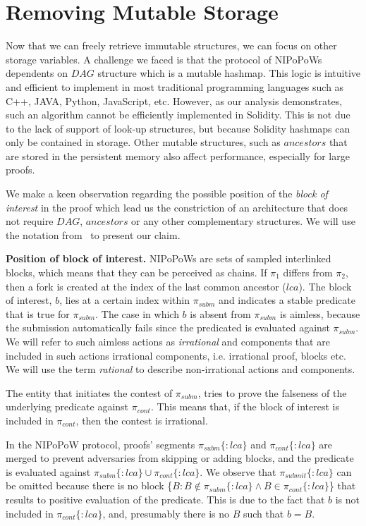 \section{Removing Mutable Storage}

Now that we can freely retrieve immutable structures, we can focus on other
storage variables. A challenge we faced is that the protocol of NIPoPoWs
dependents on $DAG$ structure which is a mutable hashmap. This logic is
intuitive and efficient to implement in most traditional programming languages
such as C++, JAVA, Python, JavaScript, etc. However, as our analysis
demonstrates, such an algorithm cannot be efficiently implemented in Solidity.
This is not due to the lack of support of look-up structures, but because
Solidity hashmaps can only be contained in storage. Other
mutable structures, such as $ancestors$ that are stored in the persistent
memory also affect performance, especially for large proofs.

We make a keen observation regarding the possible position of the \emph{block
of interest} in the proof which lead us the constriction of an architecture
that does not require $DAG$, $ancestors$ or any other complementary structures.
We will use the notation from~\cite{nipopows} to present our claim.

\noindent \textbf{Position of block of interest.} NIPoPoWs are sets of sampled
interlinked blocks, which means that they can be perceived as chains. If
$\pi_1$ differs from $\pi_2$, then a fork is created at the index of the last
common ancestor ($lca$). The block of interest, $b$, lies at a certain index
within $\pi_{subm}$ and indicates a stable predicate~\cite{nipopows,
generic-client} that is true for $\pi_{subm}$. The case in which $b$ is absent
from $\pi_{subm}$ is aimless, because the submission automatically fails since
the predicated is evaluated against $\pi_{subm}$. We will refer to such aimless
actions as \emph{irrational} and components that are included in such actions
irrational components, i.e.  irrational proof, blocks etc. We will use the term
\emph{rational} to describe non-irrational actions and components.

The entity that initiates the contest of $\pi_{subm}$, tries to prove the
falseness of the underlying predicate against $\pi_{cont}$. This means that, if
the block of interest is included in $\pi_{cont}$, then the contest is
irrational.

In the NIPoPoW protocol, proofs' segments $\pi_{subm}\{:lca\}$ and
$\pi_{cont}\{:lca\}$ are merged to prevent adversaries from skipping or adding
blocks, and the predicate is evaluated against $\pi_{subm}\{:lca\} \cup
\pi_{cont}\{:lca\}$. We observe that $\pi_{submit}\{:lca\}$ can be omitted
because there is no block \{$B : B \notin \pi_{subm}\{:lca\} \land B \in
\pi_{cont}\{:lca\}$\} that results to positive evaluation of the predicate.
This is due to the fact that $b$ is not included in $\pi_{cont}\{:lca\}$, and,
presumably there is no $B$ such that $b = B$.

